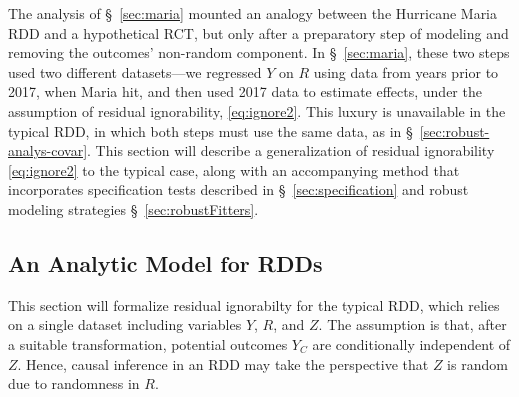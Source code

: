 

The analysis of \S~\ref{sec:maria}
mounted an analogy between the Hurricane Maria RDD and a hypothetical
RCT, but only after a preparatory step of modeling and removing the
outcomes' non-random component.
In \S~\ref{sec:maria}, these two steps used two different
datasets---we regressed $Y$ on $R$ using data from years prior to
2017, when Maria hit, and then used 2017 data to estimate effects,
under the assumption of residual ignorability, \eqref{eq:ignore2}.
This luxury is unavailable in the typical RDD, in which both steps
must use the same data, as in \S~\ref{sec:robust-analys-covar}.
This section will describe a generalization of residual ignorability
\eqref{eq:ignore2} to the typical case, along with an accompanying
method that incorporates specification tests described in \S~\ref{sec:specification} and robust
modeling strategies %
\S~\ref{sec:robustFitters}.

\subsection{An Analytic Model for RDDs} \label{sec:model-eey-c-r}

This section will formalize residual ignorabilty for the typical RDD,
which relies on a single dataset including variables $Y$, $R$, and $Z$.
The assumption is that, after a suitable transformation,
potential outcomes $Y_C$ are conditionally independent of $Z$.
Hence, causal inference in an RDD may take the perspective
that $Z$ is random due to randomness in $R$.

